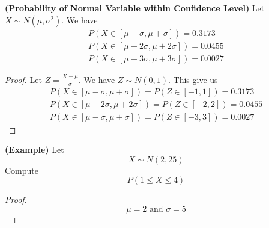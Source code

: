 \documentclass{report}
\begin{document}
\begin{theorem}
\label{2.3.15}
\textbf{(Probability of Normal Variable within Confidence Level)} Let $X\sim N(\mu, \sigma^2)$. We have
\begin{gather}
P(X\in [\mu-\sigma,\mu+\sigma])=0.3173\\
P(X\in [\mu-2\sigma, \mu+2\sigma])=0.0455\\
P(X\in [\mu-3\sigma,\mu+3\sigma])=0.0027
\end{gather}
\end{theorem}
\begin{proof}
Let $Z=\frac{X-\mu}{\sigma}$. We have $Z\sim N(0,1)$. This give us
\begin{gather}
P(X\in [\mu-\sigma,\mu+\sigma])=P(Z\in [-1,1])=0.3173\\
P(X\in [\mu-2\sigma,\mu+2\sigma])=P(Z\in [-2,2])=0.0455\\
P(X\in [\mu-\sigma,\mu+\sigma])=P(Z\in [-3,3])=0.0027
\end{gather}
\end{proof}
\begin{theorem}
\label{2.3.16}
\textbf{(Example)} Let
\begin{equation}
X\sim N(2,25)
\end{equation}
Compute
\begin{equation}
P(1\leq X\leq 4)
\end{equation}
\end{theorem}
\begin{proof}
\begin{equation}
\mu=2\text{ and }\sigma=5
\end{equation}
\end{proof}
\end{document}
